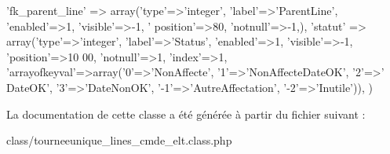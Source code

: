 \begin{DoxyCode}
        \textcolor{stringliteral}{'fk\_parent\_line'} => array(\textcolor{stringliteral}{'type'}=>\textcolor{stringliteral}{'integer'}, \textcolor{stringliteral}{'label'}=>\textcolor{stringliteral}{'ParentLine'}, \textcolor{stringliteral}{'enabled'}=>1, \textcolor{stringliteral}{'visible'}=>-1, \textcolor{stringliteral}{'
      position'}=>80, \textcolor{stringliteral}{'notnull'}=>-1,),
        \textcolor{stringliteral}{'statut'} => array(\textcolor{stringliteral}{'type'}=>\textcolor{stringliteral}{'integer'}, \textcolor{stringliteral}{'label'}=>\textcolor{stringliteral}{'Status'}, \textcolor{stringliteral}{'enabled'}=>1, \textcolor{stringliteral}{'visible'}=>-1, \textcolor{stringliteral}{'position'}=>10
      00, \textcolor{stringliteral}{'notnull'}=>1, \textcolor{stringliteral}{'index'}=>1, \textcolor{stringliteral}{'arrayofkeyval'}=>array(\textcolor{charliteral}{'0'}=>\textcolor{stringliteral}{'NonAffecte'}, \textcolor{charliteral}{'1'}=>\textcolor{stringliteral}{'NonAffecteDateOK'}, \textcolor{charliteral}{'2'}=>\textcolor{stringliteral}{'
      DateOK'}, \textcolor{charliteral}{'3'}=>\textcolor{stringliteral}{'DateNonOK'},  \textcolor{stringliteral}{'-1'}=>\textcolor{stringliteral}{'AutreAffectation'}, \textcolor{stringliteral}{'-2'}=>\textcolor{stringliteral}{'Inutile'})),
    )
\end{DoxyCode}


La documentation de cette classe a été générée à partir du fichier suivant \+:\begin{DoxyCompactItemize}
\item 
class/tourneeunique\+\_\+lines\+\_\+cmde\+\_\+elt.\+class.\+php\end{DoxyCompactItemize}
